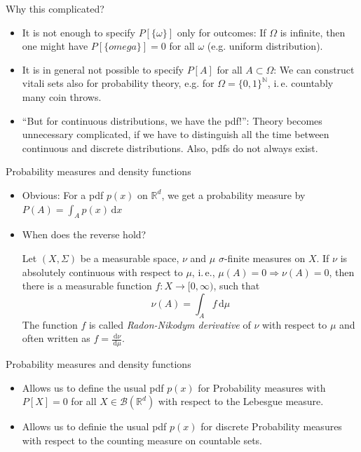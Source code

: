 \documentclass[compress]{beamer}
\newcommand{\RR}{\mathbb{R}}
\newcommand{\NN}{\mathbb{N}}
\newcommand{\td}{\,\mathrm{d}}  %
\begin{document}
\begin{frame}
  Why this complicated?
  \begin{itemize}
  \item It is not enough to specify $P[\{\omega\}]$ only for outcomes: If
    $\Omega$ is infinite, then one might have $P[\{omega\}]=0$ for all $\omega$
    (e.g. uniform distribution).
  \item It is in general not possible to specify $P[A]$ for all $A \subset
    \Omega$: We can construct vitali sets also for probability theory, e.g. for
    $\Omega = \{0,1\}^\NN$, i.\,e. countably many coin throws.
  \item ``But for continuous distributions, we have the pdf!'': Theory becomes
    unnecessary complicated, if we have to distinguish all the time between
    continuous and discrete distributions. Also, pdfs do not always exist.
  \end{itemize}
\end{frame}

\begin{frame}{Probability measures and density functions}
  \begin{itemize}
  \item Obvious: For a pdf $p(x)$ on $\RR^d$, we get a probability measure by
    $P(A) = \int_A p(x)\td x$
  \item When does the reverse hold?
  \pause
  \begin{theorem}
    Let $(X, \Sigma)$ be a measurable space, $\nu$ and $\mu$ $\sigma$-finite
    measures on $X$. If $\nu$ is absolutely continuous with respect to $\mu$,
    i.\,e., $\mu(A) = 0 \Rightarrow \nu(A) = 0$, then there is a measurable
    function $f: X \to [0, \infty)$, such that
    \[
      \nu(A) = \int_A f \td \mu
    \]
    The function $f$ is called \textit{Radon-Nikodym derivative} of $\nu$ with
    respect to $\mu$ and often written as $f = \frac{\td \nu}{\td \mu}$.
  \end{theorem}
  \end{itemize}

\end{frame}

\begin{frame}{Probability measures and density functions}
  \begin{itemize}
  \item Allows us to define the usual pdf $p(x)$ for Probability measures with
    $P[X]=0$ for all $X \in \mathcal{B}(\RR^d)$ with respect to the Lebesgue
    measure.
  \item Allows us to definie the usual pdf $p(x)$ for discrete Probability
    measures with respect to the counting measure on countable sets.
  \end{itemize}
\end{frame}
\end{document}

